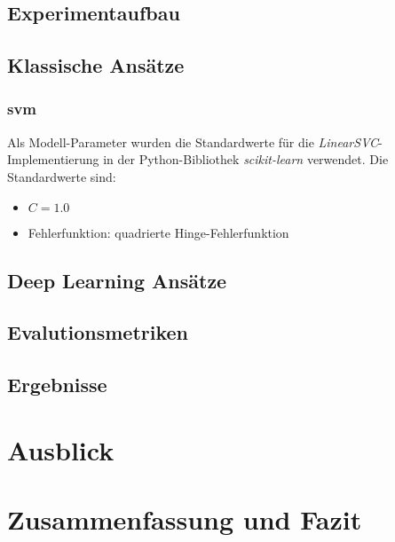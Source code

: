 \documentclass[researchlab,group,]{AIGpaper}
\begin{document}
\subsection{Experimentaufbau}

\subsection{Klassische Ansätze}

\subsubsection{\gls{svm}}

Als Modell-Parameter wurden die Standardwerte für die \textit{LinearSVC}-Implementierung in der Python-Bibliothek \textit{scikit-learn} verwendet.
Die Standardwerte sind:

\begin{itemize}
    \item $C = 1.0$
    \item Fehlerfunktion: quadrierte Hinge-Fehlerfunktion
\end{itemize}

\subsection{Deep Learning Ansätze}

\subsection{Evalutionsmetriken}

\subsection{Ergebnisse}

\section{Ausblick}

\section{Zusammenfassung und Fazit}

\newpage
\addreferences

\end{document}
